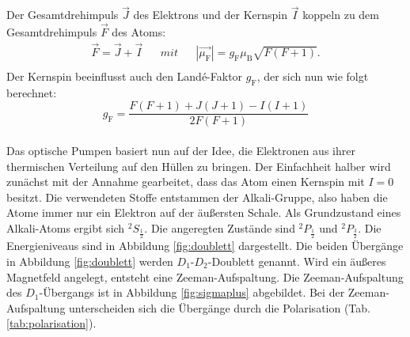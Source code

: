 Der Gesamtdrehimpuls $\vec{J}$ des Elektrons und der Kernspin $\vec{I}$ koppeln zu dem Gesamtdrehimpuls $\vec{F}$ des Atoms:
\begin{align*}
  \vec{F}=\vec{J}+\vec{I} && mit && |\vec{\mu_{\text{F}}}|= g_{\text{F}} \mu_{\text{B}} \sqrt{F(F+1)}.\\
\end{align*}
Der Kernspin beeinflusst auch den Landé-Faktor $g_{\text{F}}$, der sich nun wie folgt berechnet:
\begin{equation}
  g_{\text{F}}= \frac{F(F+1) + J(J+1) - I(I+1)}{2 F(F+1)}
  \label{eqn:landef}
\end{equation}
%
%
\\Das optische Pumpen basiert nun auf der Idee, die Elektronen aus ihrer thermischen Verteilung auf den Hüllen zu bringen.
Der Einfachheit halber wird zunächst mit der Annahme gearbeitet, dass das Atom einen Kernspin mit $I=0$ besitzt.
Die verwendeten Stoffe entstammen der Alkali-Gruppe, also haben die Atome immer nur ein Elektron auf der äußersten Schale.
Als Grundzustand eines Alkali-Atoms ergibt sich $^{2}S_{\frac{1}{2}}$.
Die angeregten Zustände sind $^{2}P_{\frac{1}{2}}$ und $^{2}P_{\frac{3}{2}}$.
Die Energieniveaus sind in Abbildung \ref{fig:doublett} dargestellt.
Die beiden Übergänge in Abbildung \ref{fig:doublett} werden $D_{1}$-$D_{2}$-Doublett genannt.
Wird ein äußeres Magnetfeld angelegt, entsteht eine Zeeman-Aufspaltung.
Die Zeeman-Aufspaltung des $D_{1}$-Übergangs ist in Abbildung \ref{fig:sigmaplus} abgebildet.
Bei der Zeeman-Aufspaltung unterscheiden sich die Übergänge durch die Polarisation (Tab. \ref{tab:polarisation}).
